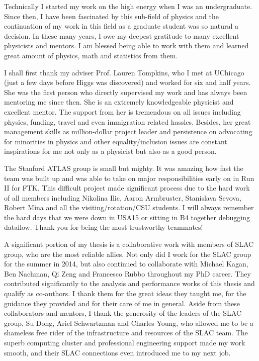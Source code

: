 Technically I started my work on the high energy when I was an undergraduate. Since then, I have been fascinated by this sub-field of physics and the continuation of my work in this field as a graduate student was so natural a decision. In these many years, I owe my deepest gratitude to many excellent physicists and mentors. I am blessed being able to work with them and learned great amount of physics, math and statistics from them.

I shall first thank my adviser Prof. Lauren Tompkins, who I met at UChicago (just a few days before Higgs was discovered) and worked for six and half years. She was the first person who directly supervised my work and has always been mentoring me since then. She is an extremely knowledgeable physicist and excellent mentor. The support from her is tremendous on all issues including physics, funding, travel and even immigration related hassles. Besides, her great management skills as million-dollar project leader and persistence on advocating for minorities in physics and other equality/inclusion issues are constant inspirations for me not only as a physicist but also as a good person.

The Stanford ATLAS group is small but mighty. It was amazing how fast the team was built up and was able to take on major responsibilities early on in Run II for FTK. This difficult project made significant process due to the hard work of all members including Nikolina Ilic, Aaron Armbruster, Stanislava Sevova, Robert Mina and all the visiting/rotation/CSU students. I will always remember the hard days that we were down in USA15 or sitting in B4 together debugging dataflow. Thank you for being the most trustworthy teammates!

A significant portion of my thesis is a collaborative work with members of SLAC group, who are the most reliable allies. Not only did I work for the SLAC group for the summer in 2014, but also continued to collaborate with Michael Kagan, Ben Nachman, Qi Zeng and Francesco Rubbo throughout my PhD career. They contributed significantly to the analysis and performance works of this thesis and qualify as co-authors. I thank them for the great ideas they taught me, for the guidance they provided and for their care of me in general. Aside from these collaborators and mentors, I thank the generosity of the leaders of the SLAC group, Su Dong, Ariel Schwartzman and Charles Young, who allowed me to be a shameless free rider of the infrastructure and resources of the SLAC team. The superb computing cluster and professional engineering support made my work smooth, and their SLAC connections even introduced me to my next job.

